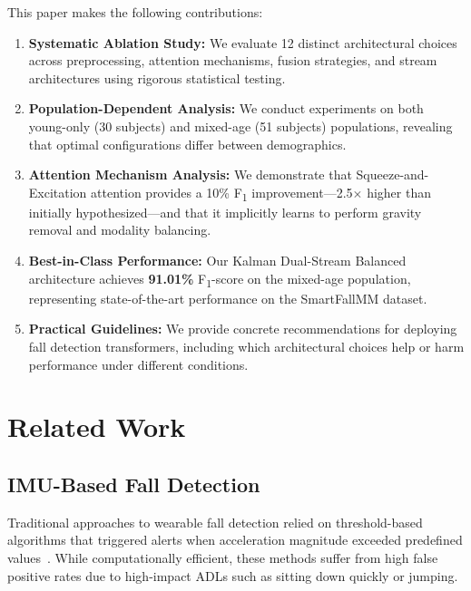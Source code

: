 \documentclass[journal,12pt]{IEEEtran}
\newcommand{\best}[1]{\textbf{\textcolor{bestresult}{#1}}}
\newcommand{\fone}{F\textsubscript{1}}
\begin{document}
This paper makes the following contributions:

\begin{enumerate}
    \item \textbf{Systematic Ablation Study:} We evaluate 12 distinct architectural choices across preprocessing, attention mechanisms, fusion strategies, and stream architectures using rigorous statistical testing.

    \item \textbf{Population-Dependent Analysis:} We conduct experiments on both young-only (30 subjects) and mixed-age (51 subjects) populations, revealing that optimal configurations differ between demographics.

    \item \textbf{Attention Mechanism Analysis:} We demonstrate that Squeeze-and-Excitation attention provides a 10\% \fone{} improvement---2.5$\times$ higher than initially hypothesized---and that it implicitly learns to perform gravity removal and modality balancing.

    \item \textbf{Best-in-Class Performance:} Our Kalman Dual-Stream Balanced architecture achieves \best{91.01\%} \fone{}-score on the mixed-age population, representing state-of-the-art performance on the SmartFallMM dataset.

    \item \textbf{Practical Guidelines:} We provide concrete recommendations for deploying fall detection transformers, including which architectural choices help or harm performance under different conditions.
\end{enumerate}


\section{Related Work}
\label{sec:related}

\subsection{IMU-Based Fall Detection}

Traditional approaches to wearable fall detection relied on threshold-based algorithms that triggered alerts when acceleration magnitude exceeded predefined values~\cite{bourke2007threshold}. While computationally efficient, these methods suffer from high false positive rates due to high-impact ADLs such as sitting down quickly or jumping.
\end{document}
